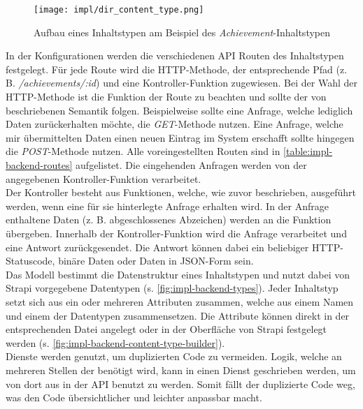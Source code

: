 \begin{figure}[htpb]
    \centering
    \texttt{[image: impl/dir\_content\_type.png]}
    \caption{Aufbau eines Inhaltstypen am Beispiel des \textit{Achievement}-Inhaltstypen}
    \label{fig:impl-backend-content-type}
\end{figure}

In der Konfigurationen werden die verschiedenen API Routen des Inhaltstypen
festgelegt. Für jede Route wird die HTTP-Methode, der entsprechende Pfad (z. B.
\textit{/achievements/:id}) und eine Kontroller-Funktion zugewiesen. Bei der
Wahl der HTTP-Methode ist die Funktion der Route zu beachten und sollte der von
\textcite{RFC7231} beschriebenen Semantik folgen. Beispielweise sollte eine
Anfrage, welche lediglich Daten zurückerhalten möchte, die \textit{GET}-Methode
nutzen. Eine Anfrage, welche mir übermittelten Daten einen neuen Eintrag im
System erschafft sollte hingegen die \textit{POST}-Methode nutzen. Alle
voreingestellten Routen sind in \autoref{table:impl-backend-routes} aufgelistet.
Die eingehenden Anfragen werden von der angegebenen Kontroller-Funktion
verarbeitet. \\
Der Kontroller besteht aus Funktionen, welche, wie zuvor beschrieben, ausgeführt
werden, wenn eine für sie hinterlegte Anfrage erhalten wird. In der Anfrage
enthaltene Daten (z. B. abgeschlossenes Abzeichen) werden an die Funktion
übergeben. Innerhalb der Kontroller-Funktion wird die Anfrage verarbeitet und
eine Antwort zurückgesendet. Die Antwort können dabei ein beliebiger
HTTP-Statuscode, binäre Daten oder Daten in JSON-Form sein.
\\
Das Modell bestimmt die Datenstruktur eines Inhaltstypen und nutzt dabei von
Strapi vorgegebene Datentypen (s. \autoref{fig:impl-backend-types}). Jeder
Inhaltstyp setzt sich aus ein oder mehreren Attributen zusammen, welche aus
einem Namen und einem der Datentypen zusammensetzen. Die Attribute können direkt
in der entsprechenden Datei angelegt oder in der Oberfläche von Strapi
festgelegt werden (s. \autoref{fig:impl-backend-content-type-builder}).
\\
Dienste werden genutzt, um duplizierten Code zu vermeiden. Logik, welche an
mehreren Stellen der benötigt wird, kann in einen Dienst geschrieben werden, um
von dort aus in der API benutzt zu werden. Somit fällt der duplizierte Code weg,
was den Code übersichtlicher und leichter anpassbar macht.

